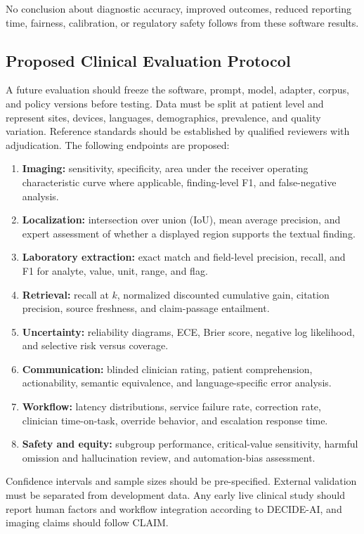 \documentclass[conference]{IEEEtran}
\begin{document}
No conclusion about diagnostic accuracy, improved outcomes, reduced reporting time, fairness, calibration, or regulatory safety follows from these software results.

\subsection{Proposed Clinical Evaluation Protocol}

A future evaluation should freeze the software, prompt, model, adapter, corpus, and policy versions before testing. Data must be split at patient level and represent sites, devices, languages, demographics, prevalence, and quality variation. Reference standards should be established by qualified reviewers with adjudication. The following endpoints are proposed:

\begin{enumerate}
    \item \textbf{Imaging:} sensitivity, specificity, area under the receiver operating characteristic curve where applicable, finding-level F1, and false-negative analysis.
    \item \textbf{Localization:} intersection over union (IoU), mean average precision, and expert assessment of whether a displayed region supports the textual finding.
    \item \textbf{Laboratory extraction:} exact match and field-level precision, recall, and F1 for analyte, value, unit, range, and flag.
    \item \textbf{Retrieval:} recall at \(k\), normalized discounted cumulative gain, citation precision, source freshness, and claim-passage entailment.
    \item \textbf{Uncertainty:} reliability diagrams, ECE, Brier score, negative log likelihood, and selective risk versus coverage.
    \item \textbf{Communication:} blinded clinician rating, patient comprehension, actionability, semantic equivalence, and language-specific error analysis.
    \item \textbf{Workflow:} latency distributions, service failure rate, correction rate, clinician time-on-task, override behavior, and escalation response time.
    \item \textbf{Safety and equity:} subgroup performance, critical-value sensitivity, harmful omission and hallucination review, and automation-bias assessment.
\end{enumerate}

Confidence intervals and sample sizes should be pre-specified. External validation must be separated from development data. Any early live clinical study should report human factors and workflow integration according to DECIDE-AI, and imaging claims should follow CLAIM.
\end{document}
